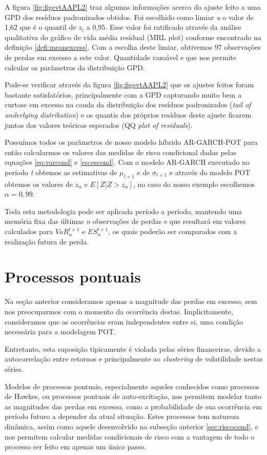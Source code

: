\documentclass[review]{elsarticle}
\theoremstyle{definition}
\begin{document}
A figura \ref{fig:figevtAAPL2} traz algumas informações acerca do ajuste feito a uma GPD dos resíduos padronizados obtidos. Foi escolhido como limiar \emph{u} o valor de 1,62 que é o quantil de $z_t$ a 0,95. Esse valor foi ratificado através da análise qualitativa do gráfico de vida média residual (MRL plot) conforme encontrado na definição \ref{defi:meanexcess}. Com a escolha deste limiar, obtivemos 97 observações de perdas em excesso a este valor. Quantidade razoável e que nos permite calcular os parâmetros da distribuição GPD.

Pode-se verificar através da figura \ref{fig:figevtAAPL2} que os ajustes feitos foram bastante satisfatórios, principalmente com a GPD capturando muito bem a curtose em excesso na cauda da distribuição dos resíduos padronizados (\emph{tail of underlying distribution}) e os quantis dos próprios resíduos deste ajuste ficarem juntos dos valores teóricos esperados (QQ \emph{plot of residuals}).

Possuímos todos os parâmetros de nosso modelo híbrido AR-GARCH-POT para então calcularmos os valores das medidas de risco condicional dadas pelas equações \eqref{eq:varcond} e \eqref{eq:escond}. Com o modelo AR-GARCH executado no período \emph{t} obtemos as estimativas de $\mu_{t+1}$ e de $\sigma_{t+1}$ e através do modelo POT obtemos os valores de $z_\alpha$ e $E[Z|Z>z_\alpha]$, no caso do nosso exemplo escolhemos $\alpha=0,99$.

Toda esta metodologia pode ser aplicada período a período, mantendo uma memória fixa das últimas \emph{n} observações de perdas e que resultará em valores calculados para $VaR_\alpha^{t+1}$ e $ES_\alpha^{t+1}$, os quais poderão ser comparados com a realização futura de perda.
\section{Processos pontuais}
\label{sec:pp}

Na seção anterior consideramos apenas a magnitude das perdas em excesso, sem nos preocuparmos com o momento da ocorrência destas. Implicitamente, consideramos que as ocorrências eram independentes entre si, uma condição necessária para a modelagem POT.

Entretanto, esta suposição tipicamente é violada pelas séries financeiras, devido a autocorrelação entre retornos e principalmente ao \emph{clustering} de volatilidade nestas séries.

Modelos de processos pontuais, especialmente aqueles conhecidos como processos de Hawkes, ou processos pontuais de auto-excitação, nos permitem modelar tanto as magnitudes das perdas em excesso, como a probabilidade de sua ocorrência em período futuro a depender da atual situação. Estes processos tem natureza dinâmica, assim como aquele desenvolvido na subseção anterior \ref{sec:riscocond}, e nos permitem calcular medidas condicionais de risco com a vantagem de todo o processo ser feito em apenas um único passo.
\end{document}
